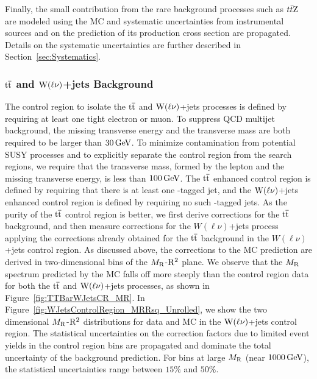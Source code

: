 Finally, the small contribution from the rare background processes such as $t\bar{t}\mathrm{Z}$ are 
modeled using the MC and systematic uncertainties from instrumental sources and on the prediction of its 
production cross section are propagated. Details on the systematic uncertainties are further described
in Section~\ref{sec:Systematics}.


\subsubsection{$\mathrm{t}\overline{\mathrm{t}}$ and $\mathrm{W}(\ell\nu)$+jets Background}
\label{sec:TTBarWJetsCR}

The control region to isolate the $\mathrm{t}\overline{\mathrm{t}}$ and $\mathrm{W}(\ell\nu)$+jets processes is defined by requiring 
at least one tight electron or muon. To suppress QCD multijet background, the missing transverse 
energy and the transverse mass are both required to be larger than $30 \,\text{Ge\hspace{-.08em}V}$. To minimize 
contamination from potential SUSY processes and to explicitly separate the control region
from the search regions, we require that the transverse mass, formed
by the lepton and the missing transverse energy, is less than 
$100 \,\text{Ge\hspace{-.08em}V}$. The $\mathrm{t}\overline{\mathrm{t}}$ enhanced control region is defined by requiring that there is at 
least one \PQb-tagged jet, and the $\mathrm{W}(\ell\nu)$+jets enhanced control region is defined by
requiring no such \PQb-tagged jets. As the purity of the $\mathrm{t}\overline{\mathrm{t}}$ control region is
better, we first derive corrections for the $\mathrm{t}\overline{\mathrm{t}}$ background, and then measure
corrections for the $W(\ell\nu)$+jets process applying the corrections already obtained
for the $\mathrm{t}\overline{\mathrm{t}}$ background in the $W(\ell\nu)$+jets control region.
As discussed above, the corrections to the MC prediction are derived in two-dimensional bins of the
$M_\mathrm{R}$-$\mathrm{R}^2$ plane. We observe that the $M_\mathrm{R}$ spectrum predicted by the MC
falls off more steeply than the control region data for both the $\mathrm{t}\overline{\mathrm{t}}$ and $\mathrm{W}(\ell\nu)$+jets
processes, as shown in Figure~\ref{fig:TTBarWJetsCR_MR}. In 
Figure~\ref{fig:WJetsControlRegion_MRRsq_Unrolled}, we show the two dimensional $M_\mathrm{R}$-$\mathrm{R}^2$ distributions
for data and MC in the $\mathrm{W}(\ell\nu)$+jets control region. The statistical uncertainties on the correction factors
due to limited event yields in the control region bins are propagated and dominate the total uncertainty 
of the background prediction. For bins at large $M_\mathrm{R}$ (near $1000\,\text{Ge\hspace{-.08em}V}$), the statistical uncertainties 
range between $15\%$ and $50\%$. 

